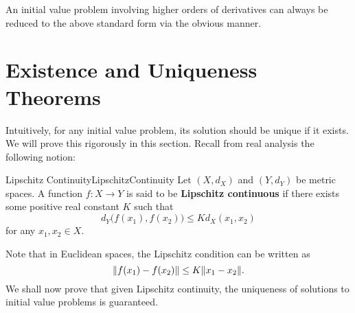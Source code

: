 \documentclass[math, code]{amznotes}
\theoremstyle{remark}
\begin{document}
An initial value problem involving higher orders of derivatives can always be reduced to the above standard form via the obvious manner.
\section{Existence and Uniqueness Theorems}
Intuitively, for any initial value problem, its solution should be unique if it exists. We will prove this rigorously in this section. Recall from real analysis the following notion:
\begin{dfnbox}{Lipschitz Continuity}{LipschitzContinuity}
    Let $\left(X, d_X\right)$ and $\left(Y, d_Y\right)$ be metric spaces. A function $f \colon X \to Y$ is said to be {\color{red} \textbf{Lipschitz continuous}} if there exists some positive real constant $K$ such that 
    \begin{equation*}
        d_Y\bigl(f(x_1), f(x_2)\bigr) \leq Kd_X(x_1, x_2)
    \end{equation*}
    for any $x_1, x_2 \in X$.
\end{dfnbox}
Note that in Euclidean spaces, the Lipschitz condition can be written as 
\begin{equation*}
    {\left\lVert {f(x_1) - f(x_2)} \right\rVert} \leq K{\left\lVert {x_1 - x_2} \right\rVert}.
\end{equation*}
We shall now prove that given Lipschitz continuity, the uniqueness of solutions to initial value problems is guaranteed.
\end{document}
